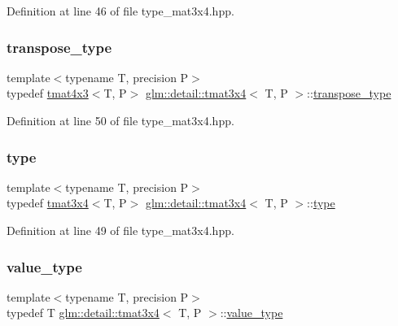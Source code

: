 Definition at line 46 of file type\+\_\+mat3x4.\+hpp.

\mbox{\label{structglm_1_1detail_1_1tmat3x4_a00d98ddf17fe798af973adf5a6916355}} 
\subsubsection{\texorpdfstring{transpose\+\_\+type}{transpose\_type}}
{\footnotesize\ttfamily template$<$typename T, precision P$>$ \\
typedef \hyperlink{structglm_1_1detail_1_1tmat4x3}{tmat4x3}$<$T, P$>$ \hyperlink{structglm_1_1detail_1_1tmat3x4}{glm\+::detail\+::tmat3x4}$<$ T, P $>$\+::\hyperlink{structglm_1_1detail_1_1tmat3x4_a00d98ddf17fe798af973adf5a6916355}{transpose\+\_\+type}}



Definition at line 50 of file type\+\_\+mat3x4.\+hpp.

\mbox{\label{structglm_1_1detail_1_1tmat3x4_ace1e67378a63acf5b64fd4d363647502}} 
\subsubsection{\texorpdfstring{type}{type}}
{\footnotesize\ttfamily template$<$typename T, precision P$>$ \\
typedef \hyperlink{structglm_1_1detail_1_1tmat3x4}{tmat3x4}$<$T, P$>$ \hyperlink{structglm_1_1detail_1_1tmat3x4}{glm\+::detail\+::tmat3x4}$<$ T, P $>$\+::\hyperlink{structglm_1_1detail_1_1tmat3x4_ace1e67378a63acf5b64fd4d363647502}{type}}



Definition at line 49 of file type\+\_\+mat3x4.\+hpp.

\mbox{\label{structglm_1_1detail_1_1tmat3x4_a541331f60862c273694a0b1f778fd571}} 
\subsubsection{\texorpdfstring{value\+\_\+type}{value\_type}}
{\footnotesize\ttfamily template$<$typename T, precision P$>$ \\
typedef T \hyperlink{structglm_1_1detail_1_1tmat3x4}{glm\+::detail\+::tmat3x4}$<$ T, P $>$\+::\hyperlink{structglm_1_1detail_1_1tmat3x4_a541331f60862c273694a0b1f778fd571}{value\+\_\+type}}



